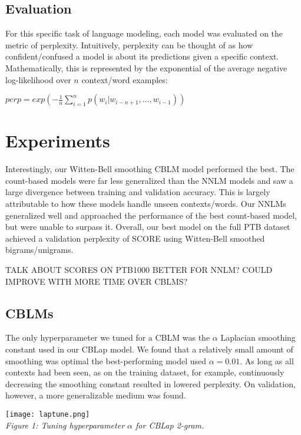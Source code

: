 \documentclass[11pt]{article}
\begin{document}
\subsection{Evaluation}
For this specific task of language modeling, each model was evaluated on the metric of perplexity. Intuitively, perplexity can be thought of as how confident/confused a model is about its predictions given a specific context. Mathematically, this is represented by the exponential of the average negative log-likelihood over $n$ context/word examples:
\begin{center}
    $perp = exp(-\frac{1}{n}\sum_{i=1}^{n} p(w_{\scriptscriptstyle i}|w_{\scriptscriptstyle i-n+1},...,w_{\scriptscriptstyle i-1}))$
\end{center}

\section{Experiments}

Interestingly, our Witten-Bell smoothing CBLM model performed the best. The count-based models were far less generalized than the NNLM models and saw a large divergence between training and validation accuracy. This is largely attributable to how these models handle unseen contexts/words. Our NNLMs generalized well and approached the performance of the best count-based model, but were unable to surpass it. Overall, our best model on the full PTB dataset achieved a validation perplexity of SCORE using Witten-Bell smoothed bigrams/unigrams.

TALK ABOUT SCORES ON PTB1000 BETTER FOR NNLM? COULD IMPROVE WITH MORE TIME OVER CBLMS?

\subsection{CBLMs}
The only hyperparameter we tuned for a CBLM was the $\alpha$ Laplacian smoothing constant used in our CBLap model. We found that a relatively small amount of smoothing was optimal \textemdash  the best-performing model used $\alpha = 0.01$. As long as all contexts had been seen, as on the training dataset, for example, continuously decreasing the smoothing constant resulted in lowered perplexity. On validation, however, a more generalizable medium was found.

\begin{center}
    \texttt{[image: laptune.png]}\\
    \textit{Figure 1: Tuning hyperparameter $\alpha$ for CBLap 2-gram.}
\end{center}
\end{document}
